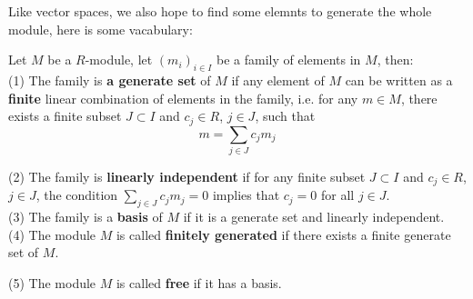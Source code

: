 Like vector spaces, we also hope to find some elemnts to generate the whole module, here is some vacabulary:
\begin{definition}
    Let \(M\) be a \(R\)-module, let \((m_i)_{i \in I}\) be a family of elements in \(M\), then:\\

    (1) The family is \textbf{a generate set} of \(M\) if any element of \(M\) can be written as a \textbf{finite} linear combination of elements in the family, i.e. for any \(m \in M\), there exists a finite subset \(J \subset I\) and \(c_j \in R\), \(j \in J\), such that
    \[m = \sum_{j \in J} c_j m_j\]

    (2) The family is \textbf{linearly independent} if for any finite subset \(J \subset I\) and \(c_j \in R\), \(j \in J\), the condition \(\sum_{j \in J} c_j m_j = 0\) implies that \(c_j = 0\) for all \(j \in J\).\\

    (3) The family is a \textbf{basis} of \(M\) if it is a generate set and linearly independent.\\

    (4) The module \(M\) is called \textbf{finitely generated} if there exists a finite generate set of \(M\).

    (5) The module \(M\) is called \textbf{free} if it has a basis.
\end{definition}

